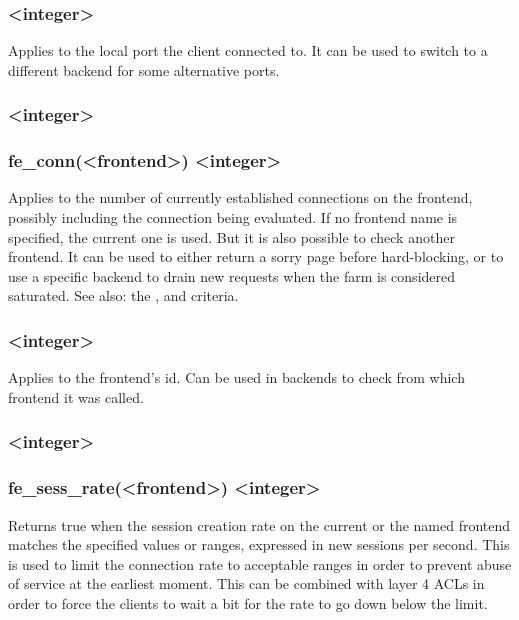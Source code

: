 \subsubsection[dst\_port]{ <integer>}
  Applies to the local port the client connected to. It can be used to switch
  to a different backend for some alternative ports.

\subsubsection[fe_conn]{ <integer>}
\subsubsection*{fe\_conn(<frontend>) <integer>}
  Applies to the number of currently established connections on the frontend,
  possibly including the connection being evaluated. If no frontend name is
  specified, the current one is used. But it is also possible to check another
  frontend. It can be used to either return a sorry page before hard-blocking,
  or to use a specific backend to drain new requests when the farm is
  considered saturated. See also: the ,  and 
  criteria.

\subsubsection[fe\_id]{ <integer>}
  Applies to the frontend's id. Can be used in backends to check from which
  frontend it was called.

\subsubsection[fe\_sess\_rate]{ <integer>}
\subsubsection*{fe\_sess\_rate(<frontend>) <integer>}
  Returns true when the session creation rate on the current or the named
  frontend matches the specified values or ranges, expressed in new sessions
  per second. This is used to limit the connection rate to acceptable ranges in
  order to prevent abuse of service at the earliest moment. This can be
  combined with layer 4 ACLs in order to force the clients to wait a bit for
  the rate to go down below the limit.

